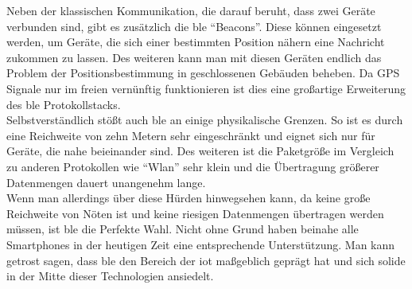 \noindent Neben der klassischen Kommunikation, die darauf beruht, dass zwei Geräte verbunden sind, gibt es zusätzlich die \ac{ble} "`Beacons"'. Diese können eingesetzt werden, um Geräte, die sich einer bestimmten Position nähern eine Nachricht zukommen zu lassen. Des weiteren kann man mit diesen Geräten endlich das Problem der Positionsbestimmung in geschlossenen Gebäuden beheben. Da GPS Signale nur im freien vernünftig funktionieren ist dies eine großartige Erweiterung des \ac{ble} Protokollstacks.\\

\noindent Selbstverständlich stößt auch \ac{ble} an einige physikalische Grenzen. So ist es durch eine Reichweite von zehn Metern sehr eingeschränkt und eignet sich nur für Geräte, die nahe beieinander sind. Des weiteren ist die Paketgröße im Vergleich zu anderen Protokollen wie "`Wlan"' sehr klein und die Übertragung größerer Datenmengen dauert unangenehm lange.\\

\noindent Wenn man allerdings über diese Hürden hinwegsehen kann, da keine große Reichweite von Nöten ist und keine riesigen Datenmengen übertragen werden müssen, ist \ac{ble} die Perfekte Wahl. Nicht ohne Grund haben beinahe alle Smartphones in der heutigen Zeit eine entsprechende Unterstützung. Man kann getrost sagen, dass \ac{ble} den Bereich der \ac{iot} maßgeblich geprägt hat und sich solide in der Mitte dieser Technologien ansiedelt.\\     
